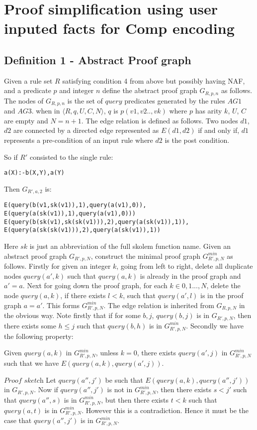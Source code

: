 \documentclass[sigconf]{acmart}
\begin{document}
\section{Proof simplification using user inputed facts for Comp encoding}\label{sec:proof_simplification}
\subsection{Definition 1 - Abstract Proof graph}
Given a rule set $R$ satisfying condition 4 from above but possibly having
NAF, and a predicate $p$ and integer $n$ define the abstract proof graph
$G_{R,p,n}$ as follows. The nodes of $G_{R,p,n}$ is the set of $query$
predicates generated by the rules $AG1$ and $AG3$. when in
$\langle R,q,U,C,N\rangle$, $q$ is $p(v1,v2..,vk)$ where $p$ has arity $k$,
$U$, $C$ are empty and $N = n+1$. The edge relation is defined as follows. Two
nodes $d1$, $d2$ are connected by a directed edge represented as $E(d1,d2)$ if
and only if, $d1$ represents a pre-condition of an input rule where $d2$ is
the post condition.

So if $R'$ consisted to the single rule:
\begin{verbatim}
a(X):-b(X,Y),a(Y)
\end{verbatim}
Then $G_{R',a,2}$ is:
\begin{verbatim}
E(query(b(v1,sk(v1)),1),query(a(v1),0)),
E(query(a(sk(v1)),1),query(a(v1),0)))
E(query(b(sk(v1),sk(sk(v1))),2),query(a(sk(v1)),1)),
E(query(a(sk(sk(v1))),2),query(a(sk(v1)),1)) \end{verbatim}
Here $sk$ is just an abbreviation of the full skolem function name. 
Given an abstract proof graph $G_{R',p,N}$, construct the minimal proof graph $G_{R',p,N}^{min}$ as follows. Firstly for given an integer $k$, going from left to right, delete all duplicate nodes $query(a',k)$ such that $query(a,k)$ is already in the proof graph and $a'=a$. Next for going down the proof graph, for each $k\in {0,1...,N}$, delete the node $query(a,k)$, if there exists $l<k$, such that $query(a',l)$ is in the proof graph $a=a'$. This forms $G_{R',p,N}^{min}$. The edge relation is inherited from $G_{R,p,N}$ in the obvious way. Note firstly that if for some $b,j$, $query(b,j)$ is in $G_{R',p,N}$, then there exists some $h\leq j$ such that $query(b,h)$ is in $G_{R',p,N}^{min}$. Secondly we have the following property:
\begin{lemma}
Given $query(a,k)$ in $G_{R',p,N}^{min}$, unless $k=0$, there exists $query(a',j)$ in $G_{R',p,N}^{min}$ such that we have $E(query(a,k),query(a',j))$.  
\end{lemma}
$\textit{Proof sketch}$ Let $query(a'',j')$ be such that $E(query(a,k),query(a'',j'))$ in $G_{R',p,N}$. Now if $query(a'',j')$ is not in $G_{R',p,N}^{min}$, then there exists $s<j'$ such that $query(a'',s)$ is in $G_{R',p,N}^{min}$, but then there exists $t<k$ such that $query(a,t)$ is in $G_{R',p,N}^{min}$. However this is a contradiction. Hence it must be the case that $query(a'',j')$ is in $G_{R',p,N}^{min}$. 
\end{document}
